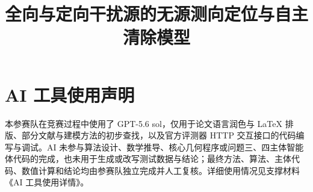 \documentclass[withoutpreface,bwprint]{cumcmthesis}
\title{全向与定向干扰源的无源测向定位与自主清除模型}
\begin{document}
\maketitle













\section*{AI 工具使用声明}
本参赛队在竞赛过程中使用了 GPT-5.6 sol，仅用于论文语言润色与 LaTeX 排版、部分文献与建模方法的初步查找，以及官方评测器 HTTP 交互接口的代码编写与调试。AI 未参与算法设计、数学推导、核心几何程序或问题三、四主体智能体代码的完成，也未用于生成或改写测试数据与结论；最终方法、算法、主体代码、数值计算和结论均由参赛队独立完成并人工复核。详细使用情况见支撑材料《AI 工具使用详情》。

\clearpage



\clearpage

\end{document}

